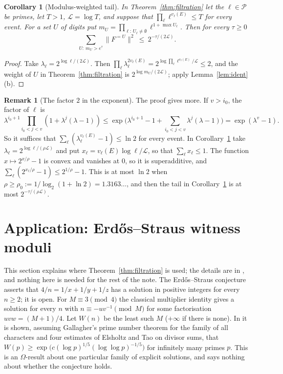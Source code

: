 \documentclass[11pt,reqno]{amsart}
\newtheorem{corollary}[theorem]{Corollary}
\theoremstyle{definition}
\newtheorem{remark}[theorem]{Remark}
\newcommand{\cP}{\mathcal P}
\newcommand{\Lc}{\mathcal L}
\begin{document}
\begin{corollary}[Modulus-weighted tail]\label{cor:modtail}
In Theorem~\ref{thm:filtration} let the $\ell\in\cP$ be primes, let $T>1$, $\Lc=\log T$,
and suppose that $\prod_\ell\ell^{v_\ell(E)}\le T$ for every event.  For a set $U$ of digits put
$m_U=\prod_{\ell:\,U_\ell\ne\emptyset}\ell^{1+\max U_\ell}$.  Then for every $\tau\ge0$
\[
 \sum_{U:\ m_U>e^\tau}\|F^{=U}\|^2\ \le\ 2^{-\tau/(2\Lc)} .
\]
\end{corollary}

\begin{proof}
Take $\lambda_\ell=2^{\log\ell/(2\Lc)}$.  Then
$\prod_\ell\lambda_\ell^{2v_\ell(E)}=2^{\log\prod_\ell\ell^{v_\ell(E)}/\Lc}\le2$, and the weight of $U$ in
Theorem~\ref{thm:filtration} is $2^{\log m_U/(2\Lc)}$; apply Lemma~\ref{lem:ident}(b).
\end{proof}

\begin{remark}[The factor $2$ in the exponent]\label{rem:rho}
The proof gives more.  If $v>i_0$, the factor of $\ell$ is
\[
 \lambda^{i_0+1}\prod_{i_0<j<v}(1+\lambda^j(\lambda-1))\le\exp\Big(\lambda^{i_0+1}-1+\sum_{i_0<j<v}\lambda^j(\lambda-1)\Big)=\exp(\lambda^v-1).
\]
So it suffices that $\sum_\ell(\lambda_\ell^{v_\ell(E)}-1)\le\ln2$ for every event.  In
Corollary~\ref{cor:modtail} take $\lambda_\ell=2^{\log\ell/(\rho\Lc)}$ and put
$x_\ell=v_\ell(E)\log\ell/\Lc$, so that $\sum_\ell x_\ell\le1$.  The function $x\mapsto2^{x/\rho}-1$ is
convex and vanishes at $0$, so it is superadditive, and
$\sum_\ell(2^{x_\ell/\rho}-1)\le2^{1/\rho}-1$.  This is at most $\ln2$ when
$\rho\ge\rho_0:=1/\log_2(1+\ln2)=1.3163\ldots$, and then the tail in
Corollary~\ref{cor:modtail} is at most $2^{-\tau/(\rho\Lc)}$.
\end{remark}

\section{Application: Erd\H{o}s--Straus witness moduli}\label{sec:app}

This section explains where Theorem~\ref{thm:filtration} is used; the details
are in \cite{Subexp}, and nothing here is needed for the rest of the note.
The Erd\H{o}s--Straus conjecture asserts that $4/n=1/x+1/y+1/z$ has a solution
in positive integers for every $n\ge2$; it is open.  For $M\equiv3\pmod4$ the
classical multiplier identity gives a solution for every $n$ with
$n\equiv-uv^{-1}\pmod M$ for some factorisation $uvw=(M+1)/4$.  Let $W(n)$ be the
least such $M$ ($+\infty$ if there is none).  In \cite{Subexp} it is shown, assuming
Gallagher's prime number theorem for the family of all characters and four
estimates of Elsholtz and Tao on divisor sums, that
$W(p)\ge\exp\big(c(\log p)^{1/5}(\log\log p)^{-1/5}\big)$ for infinitely many primes $p$.
This is an $\Omega$-result about one particular family of explicit
solutions, and says nothing about whether the conjecture holds.
\end{document}
